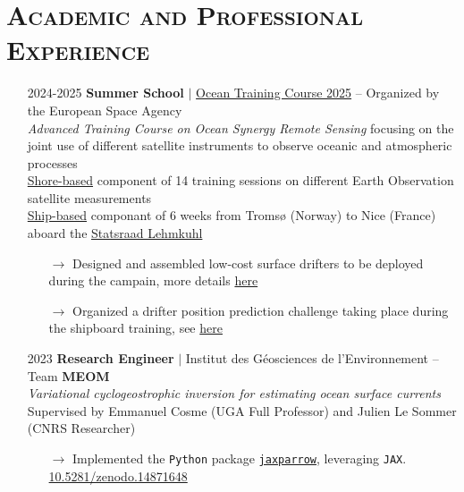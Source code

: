 \documentclass{article}
\begin{document}
\section*{\textsc{Academic and Professional Experience}}
\begin{itemize}
    \item[] 2024-2025 \tabto{2cm} \textbf{Summer School} $\vert$ \href{https://oceantrainingcourse2025.esa.int/}{Ocean Training Course 2025} – Organized by the European Space Agency \\[.1 cm]
    \tabto{2cm} \textit{Advanced Training Course on Ocean Synergy Remote Sensing} focusing on the joint use of different satellite \tabto{2cm} instruments to observe oceanic and atmospheric processes \\[.1 cm]
    \tabto{2cm} \underline{Shore-based} component of 14 training sessions on different Earth Observation satellite measurements \\[.1 cm]
    \tabto{2cm} \underline{Ship-based} componant of 6 weeks from Tromsø (Norway) to Nice (France) aboard the \href{https://lehmkuhl.no/en/}{Statsraad Lehmkuhl}
    \vspace{-.4 cm}
    \begin{itemize}[left=2cm]
        \item[$\rightarrow$] Designed and assembled low-cost surface drifters to be deployed during the campain, more details \href{https://github.com/vadmbertr/otc25-cannelloni}{here}
        \item[$\rightarrow$] Organized a drifter position prediction challenge taking place during the shipboard training, see \href{https://vadmbertr.github.io/otc25-virtual-drift/}{here}
    \end{itemize}

    \item[] 2023 \tabto{2cm} \textbf{Research Engineer} $\vert$ Institut des Géosciences de l'Environnement – Team \textbf{MEOM} \\[.1 cm]
    \tabto{2cm} \textit{Variational cyclogeostrophic inversion for estimating ocean surface currents} \\[.1 cm]
    \tabto{2cm} Supervised by Emmanuel Cosme (UGA Full Professor) and Julien Le Sommer (CNRS Researcher)
    \vspace{-.1 cm}
    \begin{itemize}[left=2cm]
        \item[$\rightarrow$] Implemented the \texttt{Python} package \href{https://github.com/meom-group/jaxparrow}{\texttt{jaxparrow}}, leveraging \texttt{JAX}. \href{https://doi.org/10.5281/zenodo.14871648}{10.5281/zenodo.14871648}
    \end{itemize}
    

\end{itemize}
\end{document}
